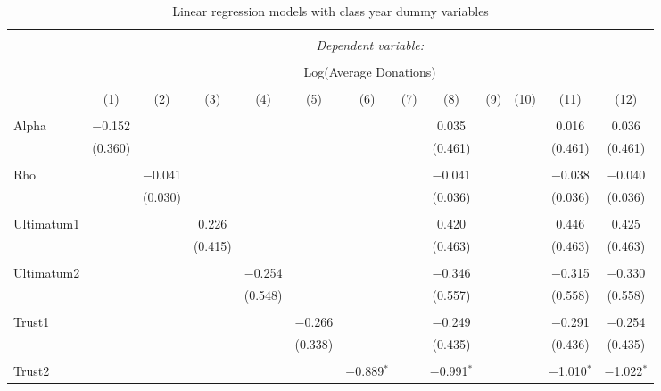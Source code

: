 \begin{subtables}
\begin{table}[H] \centering 
  \caption{Linear regression models with class year dummy variables} 
  \label{} 
   \begin{adjustbox}{width=\textwidth}
\begin{tabular}{@{\extracolsep{5pt}}lcccccccccccc} 
\\[-1.8ex]\hline 
\hline \\[-1.8ex] 
 & \multicolumn{12}{c}{\textit{Dependent variable:}} \\ 
\cline{2-13} 
\\[-1.8ex] & \multicolumn{12}{c}{Log(Average Donations)} \\ 
\\[-1.8ex] & (1) & (2) & (3) & (4) & (5) & (6) & (7) & (8) & (9) & (10) & (11) & (12)\\ 
\hline \\[-1.8ex] 
 Alpha & $-$0.152 &  &  &  &  &  &  & 0.035 &  &  & 0.016 & 0.036 \\ 
  & (0.360) &  &  &  &  &  &  & (0.461) &  &  & (0.461) & (0.461) \\ 
  & & & & & & & & & & & & \\ 
 Rho &  & $-$0.041 &  &  &  &  &  & $-$0.041 &  &  & $-$0.038 & $-$0.040 \\ 
  &  & (0.030) &  &  &  &  &  & (0.036) &  &  & (0.036) & (0.036) \\ 
  & & & & & & & & & & & & \\ 
 Ultimatum1 &  &  & 0.226 &  &  &  &  & 0.420 &  &  & 0.446 & 0.425 \\ 
  &  &  & (0.415) &  &  &  &  & (0.463) &  &  & (0.463) & (0.463) \\ 
  & & & & & & & & & & & & \\ 
 Ultimatum2 &  &  &  & $-$0.254 &  &  &  & $-$0.346 &  &  & $-$0.315 & $-$0.330 \\ 
  &  &  &  & (0.548) &  &  &  & (0.557) &  &  & (0.558) & (0.558) \\ 
  & & & & & & & & & & & & \\ 
 Trust1 &  &  &  &  & $-$0.266 &  &  & $-$0.249 &  &  & $-$0.291 & $-$0.254 \\ 
  &  &  &  &  & (0.338) &  &  & (0.435) &  &  & (0.436) & (0.435) \\ 
  & & & & & & & & & & & & \\ 
 Trust2 &  &  &  &  &  & $-$0.889$^{*}$ &  & $-$0.991$^{*}$ &  &  & $-$1.010$^{*}$ & $-$1.022$^{*}$ \\ 

\end{tabular}
\end{adjustbox}
\end{table}
\end{subtables}
